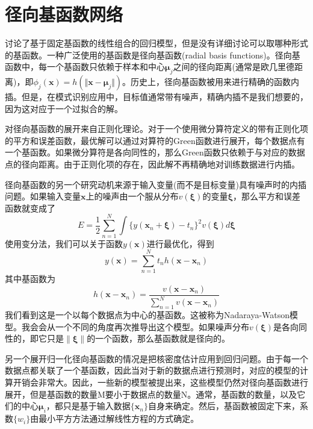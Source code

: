 \section{径向基函数网络}
讨论了基于固定基函数的线性组合的回归模型，但是没有详细讨论可以取哪种形式的基函数。一种广泛使用的基函数是径向基函数(radial basis functions)。径向基函数中，每一个基函数只依赖于样本和中心$\boldsymbol{\mu}_j$之间的径向距离(通常是欧几里德距离)，即$\phi_j(\boldsymbol{x})=h(\Vert \boldsymbol{x}-\boldsymbol{\mu}_j\Vert )$。历史上，径向基函数被用来进行精确的函数内插。但是，在模式识别应用中，目标值通常带有噪声，精确内插不是我们想要的，因为这对应于一个过拟合的解。

对径向基函数的展开来自正则化理论。对于一个使用微分算符定义的带有正则化项的平方和误差函数，最优解可以通过对算符的Green函数进行展开，每个数据点有一个基函数。如果微分算符是各向同性的，那么Green函数只依赖于与对应的数据点的径向距离。由于正则化项的存在，因此解不再精确地对训练数据进行内插。

径向基函数的另一个研究动机来源于输入变量(而不是目标变量)具有噪声时的内插问题。如果输入变量$\boldsymbol{x}$上的噪声由一个服从分布$v(\boldsymbol{\xi})$的变量$\boldsymbol{\xi}$，那么平方和误差函数就变成了
\begin{equation}
	E=\frac{1}{2}\sum_{n=1}^{N}\int \{y(\boldsymbol{x}_n+\boldsymbol{\xi})-t_n \}^2v(\boldsymbol{\xi})d\boldsymbol{\xi}
\end{equation}
使用变分法，我们可以关于函数$y(\boldsymbol{x})$进行最优化，得到 
\begin{equation}
	y(\boldsymbol{x})=\sum_{n=1}^{N}t_nh(\boldsymbol{x}-\boldsymbol{x}_n)
\end{equation}
其中基函数为
\begin{equation}
	h(\boldsymbol{x}-\boldsymbol{x}_n)=\frac{v(\boldsymbol{x}-\boldsymbol{x}_n)}{\sum_{n=1}^{N}v(\boldsymbol{x}-\boldsymbol{x}_n)}
\end{equation}
我们看到这是一个以每个数据点为中心的基函数。这被称为Nadaraya-Watson模型。我会会从一个不同的角度再次推导出这个模型。如果噪声分布$v(\boldsymbol{\xi})$是各向同性的，即它只是$\lVert \boldsymbol{\xi}\rVert$的一个函数，那么基函数就是径向的。

另一个展开归一化径向基函数的情况是把核密度估计应用到回归问题。由于每一个数据点都关联了一个基函数，因此当对于新的数据点进行预测时，对应的模型的计算开销会非常大。因此，一些新的模型被提出来，这些模型仍然对径向基函数进行展开，但是基函数的数量M要小于数据点的数量N。通常，基函数的数量，以及它们的中心$\boldsymbol{\mu}_i$，都只是基于输入数据$\{\boldsymbol{x}_n \}$自身来确定。然后，基函数被固定下来，系数$\{w_i\}$由最小平方方法通过解线性方程的方式确定。

